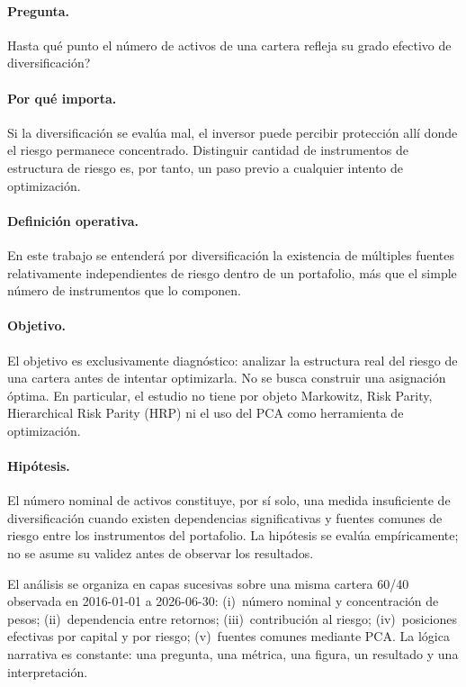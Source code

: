 \documentclass[12pt,letterpaper]{article}
\begin{document}
\paragraph{Pregunta.}
\textquestiondown{}Hasta qué punto el número de activos de una cartera refleja su grado efectivo de diversificación?

\paragraph{Por qué importa.}
Si la diversificación se evalúa mal, el inversor puede percibir protección allí donde el riesgo permanece concentrado. Distinguir cantidad de instrumentos de estructura de riesgo es, por tanto, un paso previo a cualquier intento de optimización.

\paragraph{Definición operativa.}
En este trabajo se entenderá por diversificación la existencia de múltiples fuentes relativamente independientes de riesgo dentro de un portafolio, más que el simple número de instrumentos que lo componen.

\paragraph{Objetivo.}
El objetivo es exclusivamente diagnóstico: analizar la estructura real del riesgo de una cartera antes de intentar optimizarla. No se busca construir una asignación óptima. En particular, el estudio no tiene por objeto Markowitz, Risk Parity, Hierarchical Risk Parity (HRP) ni el uso del PCA como herramienta de optimización.

\paragraph{Hipótesis.}
El número nominal de activos constituye, por sí solo, una medida insuficiente de diversificación cuando existen dependencias significativas y fuentes comunes de riesgo entre los instrumentos del portafolio. La hipótesis se evalúa empíricamente; no se asume su validez antes de observar los resultados.

El análisis se organiza en capas sucesivas sobre una misma cartera 60/40 observada en 2016-01-01 a 2026-06-30: (i)~número nominal y concentración de pesos; (ii)~dependencia entre retornos; (iii)~contribución al riesgo; (iv)~posiciones efectivas por capital y por riesgo; (v)~fuentes comunes mediante PCA. La lógica narrativa es constante: una pregunta, una métrica, una figura, un resultado y una interpretación.
\end{document}
